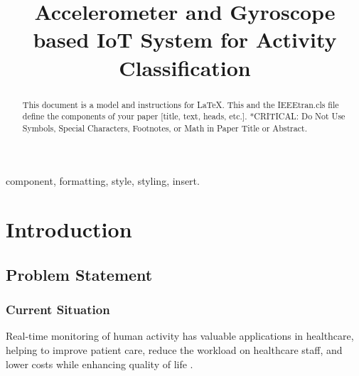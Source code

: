 \documentclass[conference]{lib/IEEEtran}
\begin{document}
\title{Accelerometer and Gyroscope based IoT System for Activity Classification\\
}

\author{
\and
{}
}

\maketitle

\begin{abstract}
This document is a model and instructions for \LaTeX.
This and the IEEEtran.cls file define the components of your paper [title, text, heads, etc.]. *CRITICAL: Do Not Use Symbols, Special Characters, Footnotes, 
or Math in Paper Title or Abstract.
\end{abstract}

\begin{IEEEkeywords}
component, formatting, style, styling, insert.
\end{IEEEkeywords}

\section{Introduction}


\subsection{Problem Statement}

\subsubsection{Current Situation}
Real-time monitoring of human activity has valuable applications in healthcare, helping to improve patient care, reduce the workload on healthcare staff, and lower costs while enhancing quality of life \cite{b1}. 
\end{document}
